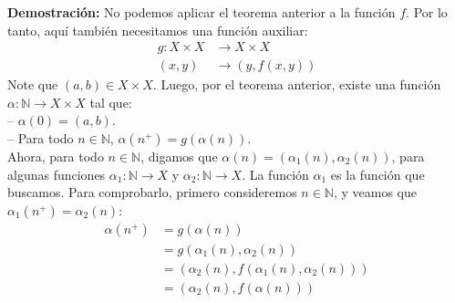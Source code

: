 \documentclass[10 pt]{article}
\begin{document}
\Large{\textbf{Demostración:} No podemos aplicar el teorema anterior a la función $f$. Por lo tanto, aquí también necesitamos una función auxiliar:}
\begin{align*}
    g: X \times X &\rightarrow X \times X \\
    (x,y)& \rightarrow (y,f(x,y))
\end{align*}
\Large{Note que $(a,b) \in X \times X$. Luego, por el teorema anterior, existe una función $\alpha:\mathbb N \rightarrow X \times X$ tal que: \\

-- $\alpha(0)=(a,b)$. \\

-- Para todo $n \in \mathbb N$, $\alpha(n^+)=g(\alpha(n))$. \\

Ahora, para todo $n \in \mathbb N$, digamos que $\alpha(n)=(\alpha_1(n),\alpha_2(n))$, para algunas funciones $\alpha_1:\mathbb N \rightarrow X$ y $\alpha_2:\mathbb N \rightarrow X$. La función $\alpha_1$ es la función que buscamos. Para comprobarlo, primero consideremos $n \in \mathbb N$, y veamos que $\alpha_1(n^+)=\alpha_2(n)$:}
\begin{align*}
    \alpha(n^+)&=g(\alpha(n)) \\
    &=g(\alpha_1(n),\alpha_2(n)) \\
    &=(\alpha_2(n),f(\alpha_1(n),\alpha_2(n))) \\
    &=(\alpha_2(n),f(\alpha(n)))
\end{align*}
\end{document}
